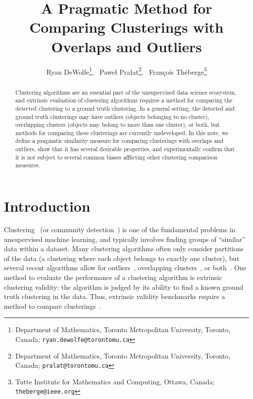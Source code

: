 \documentclass[11pt]{article}
\theoremstyle{remark}
\begin{document}
\title{A Pragmatic Method for Comparing Clusterings with Overlaps and Outliers}
\author{
    Ryan DeWolfe\thanks{Department of Mathematics, Toronto Metropolitan University, Toronto, Canada; \texttt{ryan.dewolfe@torontomu.ca}},
    ~Pawe\l{} Pra\l{}at\thanks{Department of Mathematics, Toronto Metropolitan University, Toronto, Canada; \texttt{pralat@torontomu.ca}},
    ~Fran\c{c}ois Th\'{e}berge\thanks{Tutte Institute for Mathematics and Computing, Ottawa, Canada; \texttt{theberge@ieee.org}}
    }
\date{}
\maketitle

\begin{abstract}
    Clustering algorithms are an essential part of the unsupervised data science ecosystem, and extrinsic evaluation of clustering algorithms requires a method for comparing the detected clustering to a ground truth clustering.
    In a general setting, the detected and ground truth clusterings may have outliers (objects belonging to no cluster), overlapping clusters (objects may belong to more than one cluster), or both, but methods for comparing these clusterings are currently undeveloped.
    In this note, we define a pragmatic similarity measure for comparing clusterings with overlaps and outliers, show that it has several desirable properties, and experimentally confirm that it is not subject to several common biases afflicting other clustering comparison measures.
\end{abstract}


\section{Introduction}
Clustering~\cite{clusteringhandbook} (or community detection~\cite{cdreview}) is one of the fundamental problems in unsupervised machine learning, and typically involves finding groups of ``similar'' data within a dataset.
Many clustering algorithms often only consider partitions of the data (a clustering where each object belongs to exactly one cluster), but several recent algorithms allow for outliers~\cite{hdbscan,wcc}, overlapping clusters~\cite{overlapreview}, or both~\cite{hslc,oslom}.
One method to evaluate the performance of a clustering algorithm is extrinsic clustering validity: the algorithm is judged by its ability to find a known ground truth clustering in the data.
Thus, extrinsic validity benchmarks require a method to compare clusterings~\cite{comparisonreview}.
\end{document}
